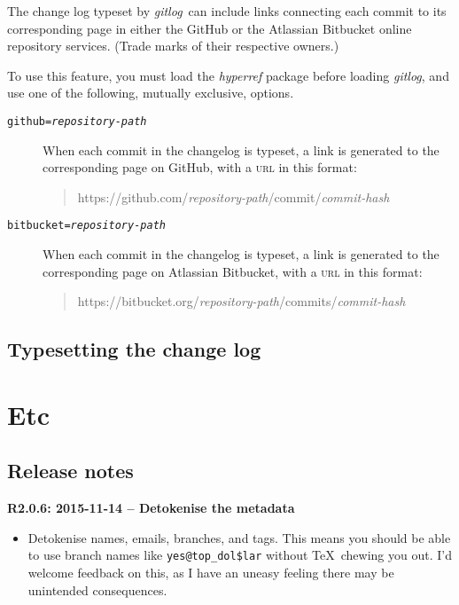 \documentclass[a4paper,12pt,twoside,openany]{memoir}
\newcommand{\rpara}[1]{\par\noindent\textbf{#1}\,}
\newcommand{\sfit}[1]{\textit{#1}}
\newcommand{\tpname}{\sfit{gitlog}}
\begin{document}
The change log typeset by \tpname\ can include links
connecting each commit to its corresponding page
in either the GitHub or the Atlassian Bitbucket 
online repository services. 
(Trade marks of their respective owners.)

To use this feature, you must load the \sfit{hyperref} package
before loading \tpname, and use one of the following, 
mutually exclusive, options.

\begin{description}

\item[\texttt{github=\textit{repository-path}}]
When each commit in the changelog is typeset,
a link is generated to the corresponding page on GitHub,
with a \textsc{url} in this format:
\begin{quote}
{\ttfamily\small
https://github.com/{\rmfamily\itshape repository-path}/commit/{\rmfamily\itshape commit-hash}
}
\end{quote}

\item[\texttt{bitbucket=\textit{repository-path}}]
When each commit in the changelog is typeset,
a link is generated to the corresponding page on Atlassian Bitbucket,
with a \textsc{url} in this format:
\begin{quote}
{\ttfamily\small
https://bitbucket.org/{\rmfamily\itshape repository-path}/commits/{\rmfamily\itshape commit-hash}
}
\end{quote}

\end{description}

\clearpage
\section{Typesetting the change log}
\chapter{Etc}
\section{Release notes}

\rpara{R2.0.6: 2015-11-14 -- Detokenise the metadata}
\begin{itemize}
\item Detokenise names, emails, branches, and tags.
This means you should be able to use branch names like \verb!yes@top_dol$lar! without 
\TeX\ chewing you out.
I'd welcome feedback on this, 
as I have an uneasy feeling there may be unintended consequences.
\end{itemize}
\end{document}
